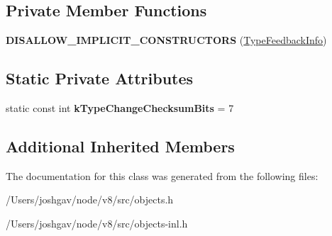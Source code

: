\subsection*{Private Member Functions}
\begin{DoxyCompactItemize}
\item 
{\bfseries D\+I\+S\+A\+L\+L\+O\+W\+\_\+\+I\+M\+P\+L\+I\+C\+I\+T\+\_\+\+C\+O\+N\+S\+T\+R\+U\+C\+T\+O\+RS} (\hyperlink{classv8_1_1internal_1_1_type_feedback_info}{Type\+Feedback\+Info})\hypertarget{classv8_1_1internal_1_1_type_feedback_info_af484f4b54b93c89e99e475b7021f29aa}{}\label{classv8_1_1internal_1_1_type_feedback_info_af484f4b54b93c89e99e475b7021f29aa}

\end{DoxyCompactItemize}
\subsection*{Static Private Attributes}
\begin{DoxyCompactItemize}
\item 
static const int {\bfseries k\+Type\+Change\+Checksum\+Bits} = 7\hypertarget{classv8_1_1internal_1_1_type_feedback_info_aa9341dafe844efe0b88f3210cfb37315}{}\label{classv8_1_1internal_1_1_type_feedback_info_aa9341dafe844efe0b88f3210cfb37315}

\end{DoxyCompactItemize}
\subsection*{Additional Inherited Members}


The documentation for this class was generated from the following files\+:\begin{DoxyCompactItemize}
\item 
/\+Users/joshgav/node/v8/src/objects.\+h\item 
/\+Users/joshgav/node/v8/src/objects-\/inl.\+h\end{DoxyCompactItemize}
